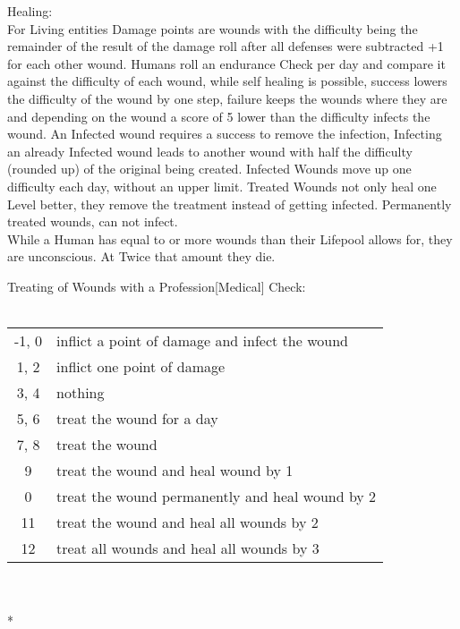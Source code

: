 \documentclass{article}
\begin{document}
    Healing:\\
    For Living entities Damage points are wounds with the difficulty being the remainder of the result of the damage roll
    after all defenses were subtracted +1 for each other wound.
    Humans roll an endurance Check per day and compare it against the difficulty of each wound, while self healing is
    possible, success lowers the difficulty of the wound by one step, failure keeps the wounds where they are and
    depending on the wound a score of 5 lower than the difficulty infects the wound.
    An Infected wound requires a success to remove the infection, Infecting an already Infected wound leads to another wound
    with half the difficulty (rounded up) of the original being created. Infected Wounds move up one difficulty each day,
    without an upper limit.
    Treated Wounds not only heal one Level better, they remove the treatment instead of getting infected. Permanently
    treated wounds, can not infect. \\
    While a Human has equal to or more wounds than their Lifepool allows for, they are unconscious. At Twice that amount
    they die.

    Treating of Wounds with a Profession[Medical] Check:\\\\
    \begin{tabular}{cl}
        -1, 0 & inflict a point of damage and infect the wound\\
        1, 2 & inflict one point of damage\\
        3, 4 & nothing\\
        5, 6 & treat the wound for a day\\
        7, 8 & treat the wound  \\
        9 & treat the wound and heal wound by 1 \\
        0 & treat the wound permanently and heal wound by 2 \\
        11 & treat the wound and heal all wounds by 2\\
        12 & treat all wounds and heal all wounds by 3\\

    \end{tabular}\\\\*
\end{document}
